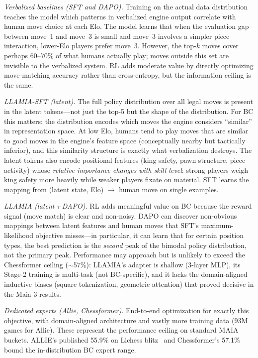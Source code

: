\emph{Verbalized baselines (SFT and DAPO).}
Training on the actual data distribution teaches the model which patterns in
verbalized engine output correlate with human move choice at each Elo.
The model learns that when the evaluation gap between move~1 and move~3 is
small and move~3 involves a simpler piece interaction, lower-Elo players
prefer move~3.
However, the top-$k$ moves cover perhaps 60--70\% of what humans actually
play; moves outside this set are invisible to the verbalized system.
RL adds moderate value by directly optimizing move-matching accuracy rather
than cross-entropy, but the information ceiling is the same.

\emph{LLAMIA-SFT (latent).}
The full policy distribution over all legal moves is present in the latent
tokens---not just the top-5 but the shape of the distribution.
For BC this matters: the distribution encodes which moves the engine
considers ``similar'' in representation space.
At low Elo, humans tend to play moves that are similar to good moves in the
engine's feature space (conceptually nearby but tactically inferior), and
this similarity structure is exactly what verbalization destroys.
The latent tokens also encode positional features (king safety, pawn
structure, piece activity) whose \emph{relative importance changes with
skill level}: strong players weigh king safety more heavily while weaker
players fixate on material.
SFT learns the mapping from (latent state, Elo) $\to$ human move on
single examples.

\emph{LLAMIA (latent\,+\,DAPO).}
RL adds meaningful value on BC because the reward signal (move match) is
clear and non-noisy.
DAPO can discover non-obvious mappings between latent features and human
moves that SFT's maximum-likelihood objective misses---in particular, it
can learn that for certain position types, the best prediction is the
\emph{second} peak of the bimodal policy distribution, not the primary
peak.
Performance may approach but is unlikely to exceed the Chessformer ceiling
(${\sim}$57\%): LLAMIA's adapter is shallow (3-layer MLP), its Stage-2
training is multi-task (not BC-specific), and it lacks the domain-aligned
inductive biases (square tokenization, geometric attention) that proved
decisive in the Maia-3 results.

\emph{Dedicated experts (Allie, Chessformer).}
End-to-end optimization for exactly this objective, with domain-aligned
architecture and vastly more training data (93M games for Allie).
These represent the performance ceiling on standard MAIA buckets.
ALLIE's published 55.9\% on Lichess blitz~\cite{zhang2024humanalignedchessbitsearch}
and Chessformer's 57.1\%~\cite{XXX_chessformer} bound the in-distribution
BC expert range.

